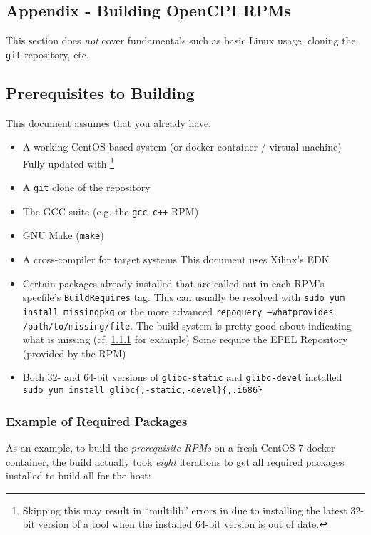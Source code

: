 \begin{appendices}

\newpage
\section{Appendix - Building OpenCPI RPMs}

\label{App:building_rpms}
This section does \textit{not} cover fundamentals such as basic Linux usage, cloning the \texttt{git} repository, etc.

\subsection{Prerequisites to Building}
\label{subsec:prereq_to_build}
This document assumes that you already have:
\begin{itemize}
\item A working CentOS-based system (or docker container / virtual machine)
\subitem Fully updated with \footnote{Skipping this may result in ``multilib'' errors in  due to installing the latest 32-bit version of a tool when the installed 64-bit version is out of date.}
\item A \texttt{git} clone of the repository
\item The GCC suite (e.g. the \texttt{gcc-c++} RPM)
\item GNU Make (\texttt{make})
\item A cross-compiler for target systems
\subitem This document uses Xilinx's EDK
\item Certain packages already installed that are called out in each RPM's specfile's \texttt{BuildRequires} tag.
\subitem This can usually be resolved with \texttt{sudo yum install missingpkg} or the more advanced \texttt{repoquery --whatprovides /path/to/missing/file}.
\subitem The build system is pretty good about indicating what is missing (cf. \ref{subsubsec:example_build} for example)
\subitem Some require the EPEL Repository (provided by the  RPM)
\item Both 32- and 64-bit versions of \texttt{glibc-static} and \texttt{glibc-devel} installed
\subitem \verb+sudo yum install glibc{,-static,-devel}{,.i686}+
\end{itemize}

\subsubsection{Example of Required Packages}
\label{subsubsec:example_build}
As an example, to build the \textit{prerequisite RPMs} on a fresh CentOS 7 docker container, the build actually took \textit{eight} iterations to get all required packages installed to build all for the host:


\end{appendices}
